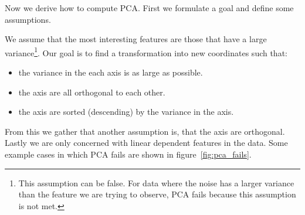 \documentclass[a4paper]{IEEEtran}
\begin{document}
Now we derive how to compute PCA. First we formulate a goal and define some assumptions.

We assume that the most interesting features are those that have a large variance\footnote{This assumption can be false. For data where the noise has a larger variance than the feature we are trying to observe, PCA fails because this assumption is not met.}. Our goal is to find a transformation into new coordinates such that:
\begin{itemize}
	\item the variance in the each axis is as large as possible.
	\item the axis are all orthogonal to each other.
	\item the axis are sorted (descending) by the variance in the axis.
\end{itemize}

From this we gather that another assumption is, that the axis are orthogonal. Lastly we are only concerned with linear dependent features in the data. Some example cases in which PCA fails are shown in figure~\ref{fig:pca_fails}.
\end{document}
